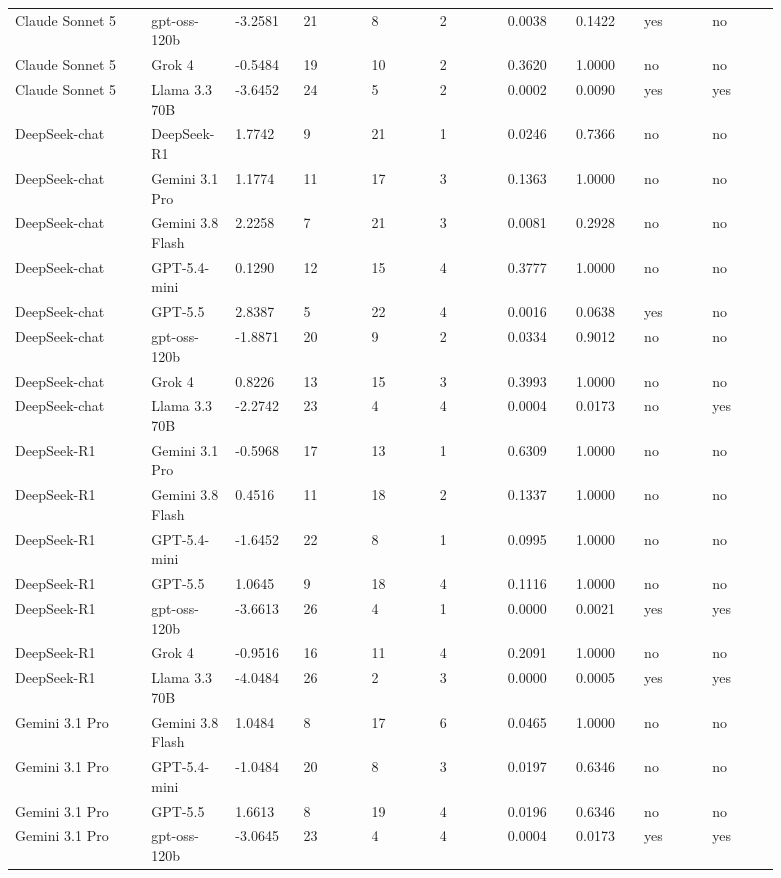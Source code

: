 \begin{landscape}
\begin{longtable}{p{0.162\linewidth}p{0.081\linewidth}p{0.081\linewidth}p{0.081\linewidth}p{0.081\linewidth}p{0.081\linewidth}p{0.081\linewidth}p{0.081\linewidth}p{0.081\linewidth}p{0.081\linewidth}}
Claude Sonnet 5 & gpt-oss-120b & -3.2581 & 21 & 8 & 2 & 0.0038 & 0.1422 & yes & no \\
Claude Sonnet 5 & Grok 4 & -0.5484 & 19 & 10 & 2 & 0.3620 & 1.0000 & no & no \\
Claude Sonnet 5 & Llama 3.3 70B & -3.6452 & 24 & 5 & 2 & 0.0002 & 0.0090 & yes & yes \\
DeepSeek-chat & DeepSeek-R1 & 1.7742 & 9 & 21 & 1 & 0.0246 & 0.7366 & no & no \\
DeepSeek-chat & Gemini 3.1 Pro & 1.1774 & 11 & 17 & 3 & 0.1363 & 1.0000 & no & no \\
DeepSeek-chat & Gemini 3.8 Flash & 2.2258 & 7 & 21 & 3 & 0.0081 & 0.2928 & no & no \\
DeepSeek-chat & GPT-5.4-mini & 0.1290 & 12 & 15 & 4 & 0.3777 & 1.0000 & no & no \\
DeepSeek-chat & GPT-5.5 & 2.8387 & 5 & 22 & 4 & 0.0016 & 0.0638 & yes & no \\
DeepSeek-chat & gpt-oss-120b & -1.8871 & 20 & 9 & 2 & 0.0334 & 0.9012 & no & no \\
DeepSeek-chat & Grok 4 & 0.8226 & 13 & 15 & 3 & 0.3993 & 1.0000 & no & no \\
DeepSeek-chat & Llama 3.3 70B & -2.2742 & 23 & 4 & 4 & 0.0004 & 0.0173 & no & yes \\
DeepSeek-R1 & Gemini 3.1 Pro & -0.5968 & 17 & 13 & 1 & 0.6309 & 1.0000 & no & no \\
DeepSeek-R1 & Gemini 3.8 Flash & 0.4516 & 11 & 18 & 2 & 0.1337 & 1.0000 & no & no \\
DeepSeek-R1 & GPT-5.4-mini & -1.6452 & 22 & 8 & 1 & 0.0995 & 1.0000 & no & no \\
DeepSeek-R1 & GPT-5.5 & 1.0645 & 9 & 18 & 4 & 0.1116 & 1.0000 & no & no \\
DeepSeek-R1 & gpt-oss-120b & -3.6613 & 26 & 4 & 1 & 0.0000 & 0.0021 & yes & yes \\
DeepSeek-R1 & Grok 4 & -0.9516 & 16 & 11 & 4 & 0.2091 & 1.0000 & no & no \\
DeepSeek-R1 & Llama 3.3 70B & -4.0484 & 26 & 2 & 3 & 0.0000 & 0.0005 & yes & yes \\
Gemini 3.1 Pro & Gemini 3.8 Flash & 1.0484 & 8 & 17 & 6 & 0.0465 & 1.0000 & no & no \\
Gemini 3.1 Pro & GPT-5.4-mini & -1.0484 & 20 & 8 & 3 & 0.0197 & 0.6346 & no & no \\
Gemini 3.1 Pro & GPT-5.5 & 1.6613 & 8 & 19 & 4 & 0.0196 & 0.6346 & no & no \\
Gemini 3.1 Pro & gpt-oss-120b & -3.0645 & 23 & 4 & 4 & 0.0004 & 0.0173 & yes & yes \\

\end{longtable}
\end{landscape}
